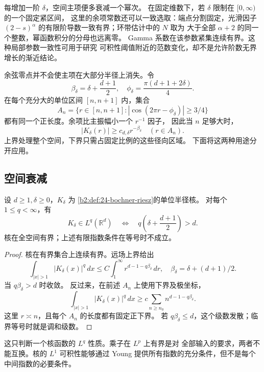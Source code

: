 \ProseParagraphBreak
每增加一阶 \(\delta\)，空间主项便多衰减一个幂次。
在固定维数下，若 \(\delta\) 限制在 \([0,\infty)\) 的一个固定紧区间，
这里的余项常数还可以一致选取：端点分割固定，光滑因子
\((2-s)^\alpha\) 的有限阶导数一致有界；环带估计中的 \(N\) 取为
大于全部 \(\alpha+2\) 的同一个整数，幂函数积分的分母也远离零。
Gamma 系数在该参数紧集连续有界。这种局部参数一致性可用于研究
可积性阈值附近的范数变化，却不是允许阶数无界增长的渐近结论。

\ProseParagraphBreak
余弦零点并不会使主项在大部分半径上消失。令
\[
 \beta_\delta=\delta+\frac{d+1}{2},\quad
 \phi_\delta=\frac{\pi(d+1+2\delta)}4.
\]
在每个充分大的单位区间 \([n,n+1]\) 内，集合
\[
 A_n=\{r\in[n,n+1]:|\cos(2\pi r-\phi_\delta)|\geq3/4\}
\]
都有同一个正长度。余项比主振幅小一个 \(r^{-1}\) 因子，
因此当 \(n\) 足够大时，
\[
 |K_\delta(r)|\geq c_{d,\delta}r^{-\beta_\delta}
       \quad(r\in A_n).
\]
上界处理整个空间，下界只需占固定比例的这些径向区域。
下面将这两种用途分开应用。

\subsection{空间衰减}
\label{b2:subsec:240203}

\begin{proposition}[核的有限指数可积性]\label{b2:prop:24-kernel-tail}
设 \(d\geq1,\delta\geq0\)，\(K_\delta\) 为
\cref{b2:def:24-bochner-riesz}的单位半径核。
对每个 \(1\leq q<\infty\)，有
\[
 K_\delta\in L^q(\mathbb R^d)
 \quad\Longleftrightarrow\quad
 q\left(\delta+\frac{d+1}{2}\right)>d.
\]
核在全空间有界；上述有限指数条件在等号时不成立。
\end{proposition}
\begin{proof}
核在有界集合上连续有界。远场上界给出
\[
 \int_{|x|>1}|K_\delta(x)|^q\,dx
 \leq C\int_1^\infty r^{d-1-q\beta_\delta}\,dr,
 \quad \beta_\delta=\delta+(d+1)/2.
\]
当 \(q\beta_\delta>d\) 时收敛。
反过来，在前述 \(A_n\) 上使用下界及极坐标，
\[
 \int_{|x|>1}|K_\delta(x)|^q\,dx
       \geq c\sum_{n\geq n_0}n^{d-1-q\beta_\delta}.
\]
这里 \(r\asymp n\)，且每个 \(A_n\) 的长度都有固定正下界。
若 \(q\beta_\delta\leq d\)，这个级数发散；临界等号时就是调和级数。
\end{proof}

这只判断一个核函数的 \(L^q\) 性质。乘子在 \(L^p\) 上有界是对
全部输入的要求，两者不能互换。核的 \(L^1\) 可积性能够通过 Young
提供所有指数的充分条件，但不是每个中间指数的必要条件。

